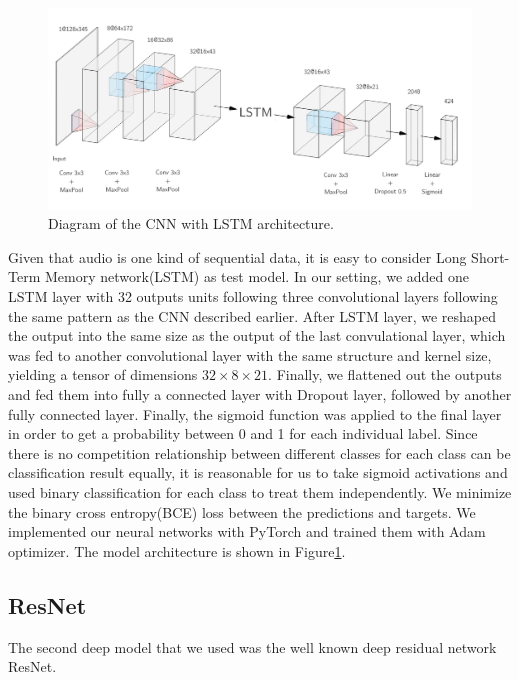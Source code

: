 \documentclass{article}
\begin{document}
\begin{figure}
\includegraphics[scale=0.45]{CNN_LSTM_diagram.png}
\caption{Diagram of the CNN with LSTM architecture. \label{cnn_lstm}}
\end{figure}

Given that audio is one kind of sequential data, it is easy to consider Long Short-Term Memory network(LSTM) as test model. In our setting, we added one LSTM layer with 32 outputs units following three convolutional layers following the same pattern as the CNN described earlier. After LSTM layer, we reshaped the output into the same size as the output of the last convulational layer, which was fed to another convolutional layer with the same structure and kernel size, yielding a tensor of dimensions $32\times 8 \times 21$. Finally, we flattened out the outputs and fed them into fully a connected layer with Dropout layer, followed by another fully connected layer. Finally, the sigmoid function was applied to the final layer in order to get a probability between 0 and 1 for each individual label. Since there is no competition relationship between different classes for each class can be classification result equally, it is reasonable for us to take sigmoid activations and used binary classification for each class to treat them independently. We minimize the binary cross entropy(BCE) loss between the predictions and targets. We implemented our neural networks with PyTorch and trained them with Adam optimizer. The model architecture is shown in Figure\ref{cnn_lstm}.\\


\subsection{ResNet}

The second deep model that we used was the well known deep residual network ResNet.
\end{document}
